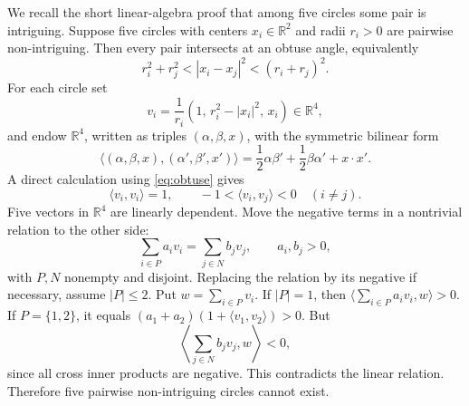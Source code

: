 \documentclass[12pt]{article}
\theoremstyle{plain}
\theoremstyle{definition}
\theoremstyle{remark}
\begin{document}
We recall the short linear-algebra proof that among five circles some pair is
intriguing.  Suppose five circles with centers \(x_i\in\mathbb R^2\) and radii
\(r_i>0\) are pairwise non-intriguing.  Then every pair intersects at an
obtuse angle, equivalently
\begin{equation}\label{eq:obtuse}
  r_i^2+r_j^2<|x_i-x_j|^2<(r_i+r_j)^2.
\end{equation}
For each circle set
\[
  v_i=\frac1{r_i}(1,\,r_i^2-|x_i|^2,\,x_i)\in\mathbb R^4,
\]
and endow \(\mathbb R^4\), written as triples \((\alpha,\beta,x)\), with the
symmetric bilinear form
\[
  \langle(\alpha,\beta,x),(\alpha',\beta',x')\rangle
  =\frac12\alpha\beta'+\frac12\beta\alpha'+x\cdot x'.
\]
A direct calculation using \eqref{eq:obtuse} gives
\[
  \langle v_i,v_i\rangle=1,
  \qquad
  -1<\langle v_i,v_j\rangle<0\quad(i\ne j).
\]
Five vectors in \(\mathbb R^4\) are linearly dependent.  Move the negative
terms in a nontrivial relation to the other side:
\[
  \sum_{i\in P}a_i v_i=\sum_{j\in N}b_j v_j,
  \qquad a_i,b_j>0,
\]
with \(P,N\) nonempty and disjoint.  Replacing the relation by its negative if
necessary, assume \(|P|\le2\).  Put \(w=\sum_{i\in P}v_i\).  If \(|P|=1\),
then \(\langle\sum_{i\in P}a_i v_i,w\rangle>0\).  If
\(P=\{1,2\}\), it equals
\((a_1+a_2)(1+\langle v_1,v_2\rangle)>0\).  But
\[
  \left\langle\sum_{j\in N}b_j v_j,w\right\rangle<0,
\]
since all cross inner products are negative.  This contradicts the linear
relation.  Therefore five pairwise non-intriguing circles cannot exist.
\end{document}
